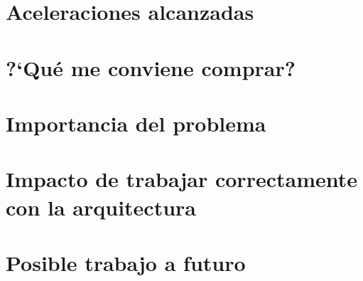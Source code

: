\section{Aceleraciones alcanzadas}
%


\section{?`Qu\'e me conviene comprar?}


\section{Importancia del problema}
\section{Impacto de trabajar correctamente con la arquitectura}
\section{Posible trabajo a futuro}

